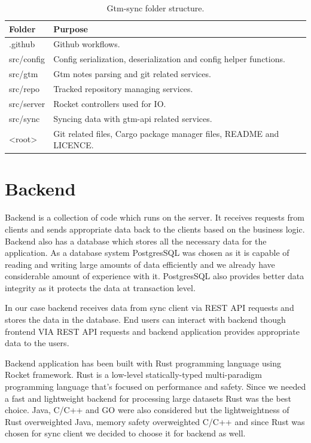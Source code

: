 \begin{table}[h]
    \centering
    \begin{tabular}{ | p{3cm} | p{10cm} |}
        \hline
        Folder & Purpose\\
        \hline
        .github & Github workflows.\\
        \hline
        src/config & Config serialization, deserialization and config helper functions.\\
        \hline
        src/gtm & Gtm notes parsing and git related services.\\
        \hline
        src/repo & Tracked repository managing services.\\
        \hline
        src/server & Rocket controllers used for IO.\\
        \hline
        src/sync & Syncing data with gtm-api related services.\\
        \hline
        <root> & Git related files, Cargo package manager files, README and LICENCE.\\
        \hline
    \end{tabular}
    \caption{Gtm-sync folder structure.}
    \label{tab:gtm-sync-folder-structure}
\end{table}

\section{Backend}\label{sec:backend}
Backend is a collection of code which runs on the server.
It receives requests from clients and sends appropriate data back to the clients based on the business logic.
Backend also has a database which stores all the necessary data for the application.
As a database system PostgresSQL was chosen as it is capable of reading and writing large amounts of data efficiently and we already have considerable amount of experience with it.
PostgresSQL also provides better data integrity as it protects the data at transaction level.

In our case backend receives data from sync client via REST API requests and stores the data in the database.
End users can interact with backend though frontend VIA REST API requests and backend application provides appropriate data to the users.

Backend application has been built with Rust programming language using Rocket framework.
Rust is a low-level statically-typed multi-paradigm programming language that's focused on performance and safety.
Since we needed a fast and lightweight backend for processing large datasets Rust was the best choice.
Java, C/C++ and GO were also considered but the lightweightness of Rust overweighted Java, memory safety overweighted C/C++ and since Rust was chosen for sync client we decided to choose it for backend as well.

